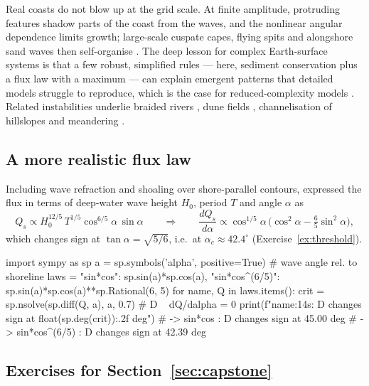 \documentclass[11pt,letterpaper]{article}
\numberwithin{equation}{section}
\newcommand{\od}[2]{\frac{d #1}{d #2}}
\begin{document}
\begin{research}
Real coasts do not blow up at the grid scale. At finite amplitude, protruding features shadow parts of the coast from the waves, and
the nonlinear angular dependence limits growth; large-scale cuspate capes, flying spits and alongshore sand waves then
self-organise \citep{ashton2001,ashton2006}. The deep lesson for complex Earth-surface systems is that a few robust, simplified
rules --- here, sediment conservation plus a flux law with a maximum --- can explain emergent patterns that detailed models struggle
to reproduce, which is the case for reduced-complexity models \citep{murray2007,murray2009}. Related instabilities underlie braided
rivers \citep{murray1994}, dune fields \citep{werner1995}, channelisation of hillslopes \citep{smith1972} and meandering
\citep{ikeda1981}.
\end{research}

\subsection{A more realistic flux law}
Including wave refraction and shoaling over shore-parallel contours, \citet{ashton2006} expressed the flux in terms of deep-water wave
height $H_0$, period $T$ and angle $\alpha$ as
\[
Q_s\propto H_0^{12/5}\,T^{1/5}\cos^{6/5}\!\alpha\,\sin\alpha
\qquad\Longrightarrow\qquad
\od{Q_s}{\alpha}\propto\cos^{1/5}\!\alpha\,\Big(\cos^2\alpha-\tfrac65\sin^2\alpha\Big),
\]
which changes sign at $\tan\alpha=\sqrt{5/6}$, i.e.\ at $\alpha_c\approx42.4^\circ$ (Exercise~\ref{ex:threshold}).

\begin{pycode}
import sympy as sp
a = sp.symbols('alpha', positive=True)     # wave angle rel. to shoreline
laws = {"sin*cos": sp.sin(a)*sp.cos(a),
        "sin*cos^(6/5)": sp.sin(a)*sp.cos(a)**sp.Rational(6, 5)}
for name, Q in laws.items():
    crit = sp.nsolve(sp.diff(Q, a), a, 0.7)    # D ~ dQ/dalpha = 0
    print(f"{name:14s}: D changes sign at {float(sp.deg(crit)):.2f} deg")
# -> sin*cos       : D changes sign at 45.00 deg
# -> sin*cos^(6/5) : D changes sign at 42.39 deg
\end{pycode}

\subsection*{Exercises for Section~\ref{sec:capstone}}
\end{document}
